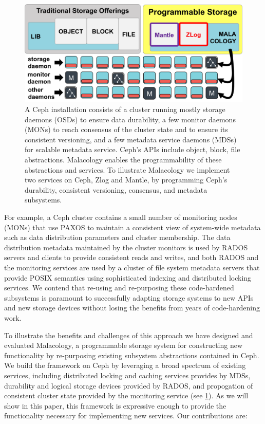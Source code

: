 \documentclass[10pt,twocolumn]{article}
\begin{document}
\begin{figure}[htbp]
\centering
\includegraphics{figures/overview.png}
\caption{A Ceph installation consists of a cluster running mostly
storage daemons (OSDs) to ensure data durability, a few monitor daemons
(MONs) to reach consensus of the cluster state and to ensure its
consistent versioning, and a few metadata service daemons (MDSs) for
scalable metadata service. Ceph's APIs include object, block, file
abstractions. Malacology enables the programmability of these
abstractions and services. To illustrate Malacology we implement two
services on Ceph, Zlog and Mantle, by programming Ceph's durability,
consistent versioning, consensus, and metadata subsystems.
\label{fig:overview}}
\end{figure}

For example, a Ceph cluster contains a small number of
monitoring nodes (MONs) that use PAXOS to maintain a consistent view of
system-wide metadata such as data distribution parameters and cluster
membership. The data distribution metadata maintained by
the cluster monitors is used by RADOS servers and clients to provide
consistent reads and writes, and both RADOS and the monitoring services
are used by a cluster of file system metadata servers that provide POSIX
semantics using sophisticated indexing and distributed locking services.
We contend that re-using and re-purposing these code-hardened subsystems
is paramount to successfully adapting storage systems to new APIs and
new storage devices without losing the benefits from years of
code-hardening work.

To illustrate the benefits and challenges of this approach we have
designed and evaluated Malacology, a programmable storage system for
constructing new functionality by re-purposing existing subsystem
abstractions contained in Ceph. We build the framework on Ceph by
leveraging a broad spectrum of existing services, including distributed
locking and caching services provides by MDSs, durability and logical
storage devices provided by RADOS, and propogation of consistent cluster
state provided by the monitoring service (see \ref{fig:overview}). As we will show in this paper, this framework is expressive enough to provide the
functionality necessary for implementing new services. Our contributions
are:
\end{document}
